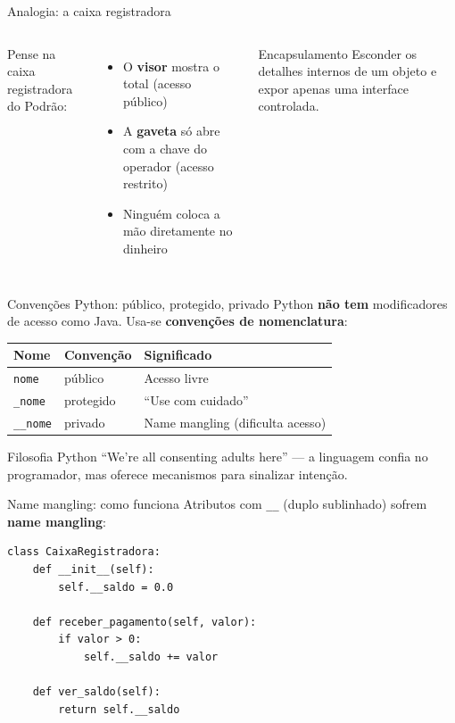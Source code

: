 \documentclass[aspectratio=169]{beamer}
\begin{document}
\begin{frame}{Analogia: a caixa registradora}
\begin{columns}[T]
Pense na caixa registradora do Podrão:
\begin{itemize}
    \item O \textbf{visor} mostra o total (acesso público)
    \item A \textbf{gaveta} só abre com a chave do operador (acesso restrito)
    \item Ninguém coloca a mão diretamente no dinheiro
\end{itemize}

\begin{block}{Encapsulamento}
Esconder os detalhes internos de um objeto e expor apenas uma
interface controlada.
\end{block}
\end{columns}
\end{frame}

\begin{frame}{Convenções Python: público, protegido, privado}
Python \textbf{não tem} modificadores de acesso como Java.
Usa-se \textbf{convenções de nomenclatura}:

\medskip
\begin{center}
\begin{tabular}{lll}
\toprule
\textbf{Nome} & \textbf{Convenção} & \textbf{Significado} \\
\midrule
\texttt{nome}    & público   & Acesso livre \\
\texttt{\_nome}  & protegido & ``Use com cuidado'' \\
\texttt{\_\_nome}& privado   & Name mangling (dificulta acesso) \\
\bottomrule
\end{tabular}
\end{center}

\medskip
\begin{exampleblock}{Filosofia Python}
``We're all consenting adults here'' --- a linguagem confia no programador,
mas oferece mecanismos para sinalizar intenção.
\end{exampleblock}
\end{frame}

\begin{frame}[fragile]{Name mangling: como funciona}
Atributos com \texttt{\_\_} (duplo sublinhado) sofrem \textbf{name mangling}:

\begin{lstlisting}
class CaixaRegistradora:
    def __init__(self):
        self.__saldo = 0.0

    def receber_pagamento(self, valor):
        if valor > 0:
            self.__saldo += valor

    def ver_saldo(self):
        return self.__saldo
\end{lstlisting}
\end{frame}
\end{document}
